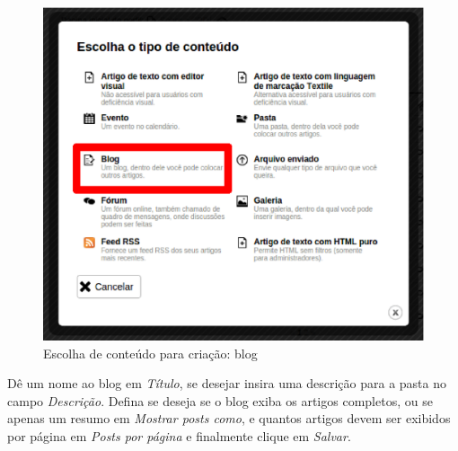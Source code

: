 \begin{figure}[H]
  \centering
    \includegraphics[keepaspectratio=true,scale=0.49]{figuras/selecionarBlog.eps}
  \caption{Escolha de conteúdo para criação: blog}
  \label{fig:selecionarBlog}
\end{figure}

\newpage
Dê um nome ao blog em \emph{Título}, se desejar insira uma descrição para a pasta no campo \emph{Descrição}. Defina se deseja se o blog exiba os artigos completos, ou se apenas um resumo em \emph{Mostrar posts como}, e quantos artigos devem ser exibidos por página em \emph{Posts por página} e finalmente clique em \emph{Salvar}.

